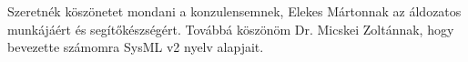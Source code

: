 \chapter*{\koszonetnyilvanitas}

Szeretnék köszönetet mondani a konzulensemnek, Elekes Mártonnak az áldozatos munkájáért és segítőkészségért. Továbbá köszönöm Dr. Micskei Zoltánnak, hogy bevezette számomra SysML v2 nyelv alapjait.
